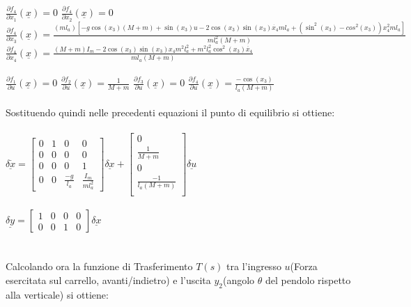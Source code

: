 $\displaystyle\frac{\partial{f_4}}{\partial{x_1}}(\underline{x})=0$\quad
$\displaystyle\frac{\partial{f_4}}{\partial{x_2}}(\underline{x})=0$\\
$\displaystyle\frac{\partial{f_4}}{\partial{x_3}}(\underline{x})=\displaystyle\frac{(ml_a)[-g\cos(x_3)(M+m)+\sin(x_3)u-2\cos(x_3)\sin(x_3)\dot{x_4}ml_a+(\sin^2(x_3)-cos^2(x_3))x^2_4ml_a]}{ml_a^2(M+m)}$\quad
$\displaystyle\frac{\partial{f_4}}{\partial{x_4}}(\underline{x})=\displaystyle\frac{(M+m)I_m-2\cos(x_3)\sin(x_3)x_4m^2l_a^2+m^2l_a^2\cos^2(x_3)\ddot{x_4}}{ml_a(M+m)}$\\\\
$\displaystyle\frac{\partial{f_1}}{\partial{u}}(\underline{x})=0$\quad
$\displaystyle\frac{\partial{f_2}}{\partial{u}}(\underline{x})=\displaystyle\frac{1}{M+m}$\quad
$\displaystyle\frac{\partial{f_3}}{\partial{u}}(\underline{x})=0$\quad
$\displaystyle\frac{\partial{f_4}}{\partial{u}}(\underline{x})=\displaystyle\frac{-\cos(x_3)}{l_a(M+m)}$\\\\
Sostituendo quindi nelle precedenti equazioni il punto di equilibrio si ottiene:\\\\
$\underline{\delta\dot{x}}=
\begin{bmatrix}
0&1&0&0\\
0&0&0&0\\
0&0&0&1\\
0&0&\displaystyle\frac{-g}{l_a}&\displaystyle\frac{I_m}{ml_a^2}
\end{bmatrix}
\underline{\delta x}+
\begin{bmatrix}
0\\
\displaystyle\frac{1}{M+m}\\
0\\
\displaystyle\frac{-1}{l_a(M+m)}\\
\end{bmatrix}
\underline{\delta u}
$\\\\
$\underline{\delta y}=
\begin{bmatrix}
1&0&0&0\\
0&0&1&0
\end{bmatrix}
\underline{\delta x}
$\\\\\\
Calcolando ora la funzione di Trasferimento $T(s)$ tra l'ingresso $u$(Forza esercitata sul carrello,
avanti/indietro) e l'uscita $y_2$(angolo $\theta$ del pendolo rispetto alla verticale) si ottiene:\\\\
